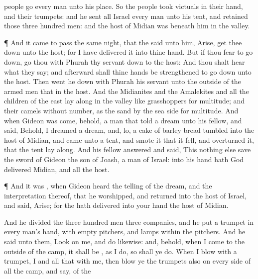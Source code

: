 {{}
people
go every
man unto his
place.
So the
people
took
victuals in their
hand, and their
trumpets: and he
sent
all
{}
Israel every
man unto his
tent, and
retained those
three
hundred
men: and the
host of
Midian was beneath him in the
valley.
\par }{\PP {}¶ And it came to pass the same
night, that the
{}
said unto him,
Arise, get thee
down unto the
host; for I have
delivered it into thine
hand.
But if thou
fear to go
down,
go thou with
Phurah thy
servant
down to the
host:
And thou shalt
hear what they
say; and
afterward shall thine
hands be
strengthened to go
down unto the
host. Then went he
down with
Phurah his
servant unto the
outside of the armed
men that
{} in the
host.
And the
Midianites and the
Amalekites and all the
children of the
east
lay along in the
valley like
grasshoppers for
multitude; and their
camels
{} without
number, as the
sand by the
sea
side for
multitude.
And when
Gideon was
come, behold,
{} a
man that
told a
dream unto his
fellow, and
said, Behold, I
dreamed a
dream, and, lo, a
cake of
barley
bread
tumbled into the
host of
Midian, and
came unto a
tent, and
smote it that it
fell, and
overturned it, that the
tent lay
along.
And his
fellow
answered and
said, This
{} nothing else save the
sword of
Gideon the
son of
Joash, a
man of
Israel:
{} into his
hand hath
God
delivered
Midian, and all the
host.
\par }{\PP {}¶ And it was
{}, when
Gideon
heard the
telling of the
dream, and the
interpretation thereof, that he
worshipped, and
returned into the
host of
Israel, and
said,
Arise; for the
{} hath
delivered into your
hand the
host of
Midian.
\par }{\PP {}And he
divided the
three
hundred
men
{}
three
companies, and he
put a
trumpet in every
man’s hand, with
empty
pitchers, and
lamps
within the
pitchers.
And he
said unto them,
Look on me, and
do likewise: and, behold, when I
come to the
outside of the
camp, it shall be
{}, as I
do, so shall ye
do.
When I
blow with a
trumpet, I and all that
{} with me, then
blow ye the
trumpets also on every
side of all the
camp, and
say,
{} of the
}
